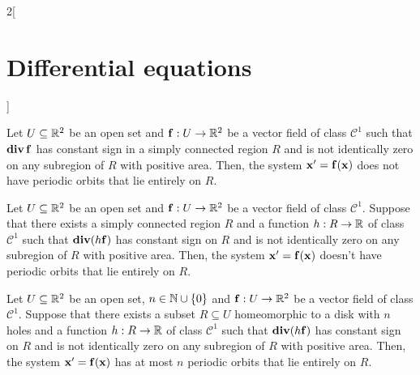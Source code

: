 \documentclass[../../../main_math.tex]{subfiles}
\begin{document}
\begin{multicols}{2}[\section{Differential equations}]
\begin{theorem}
    Let $U\subseteq \mathbb{R}^2$ be an open set and $\boldsymbol{\mathrm{f}}:U\rightarrow\mathbb{R}^2$ be a vector field of class $\mathcal{C}^1$ such that $\operatorname{\boldsymbol{\mathrm{div}}} \boldsymbol{\mathrm{f}}$ has constant sign in a simply connected region $R$ and is not identically zero on any subregion of $R$ with positive area. Then, the system $\boldsymbol{\mathrm{x}}'=\boldsymbol{\mathrm{f}}(\boldsymbol{\mathrm{x}})$ does not have periodic orbits that lie entirely on $R$.
  \end{theorem}
  \begin{theorem}
    Let $U\subseteq \mathbb{R}^2$ be an open set and $\boldsymbol{\mathrm{f}}:U\rightarrow\mathbb{R}^2$ be a vector field of class $\mathcal{C}^1$. Suppose that there exists a simply connected region $R$ and a function $h:R\rightarrow\mathbb{R}$ of class $\mathcal{C}^1$ such that $\operatorname{\boldsymbol{\mathrm{div}}} (h\boldsymbol{\mathrm{f}})$ has constant sign on $R$ and is not identically zero on any subregion of $R$ with positive area. Then, the system $\boldsymbol{\mathrm{x}}'=\boldsymbol{\mathrm{f}}(\boldsymbol{\mathrm{x}})$ doesn't have periodic orbits that lie entirely on $R$.
  \end{theorem}
  \begin{theorem}
    Let $U\subseteq \mathbb{R}^2$ be an open set, $n\in\mathbb{N}\cup\{0\}$ and $\boldsymbol{\mathrm{f}}:U\rightarrow\mathbb{R}^2$ be a vector field of class $\mathcal{C}^1$. Suppose that there exists a subset $R\subseteq U$ homeomorphic to a disk with $n$ holes and a function $h:R\rightarrow\mathbb{R}$ of class $\mathcal{C}^1$ such that $\operatorname{\boldsymbol{\mathrm{div}}} (h\boldsymbol{\mathrm{f}})$ has constant sign on $R$ and is not identically zero on any subregion of $R$ with positive area. Then, the system $\boldsymbol{\mathrm{x}}'=\boldsymbol{\mathrm{f}}(\boldsymbol{\mathrm{x}})$ has at most $n$ periodic orbits that lie entirely on $R$.
  \end{theorem}

\end{multicols}
\end{document}
